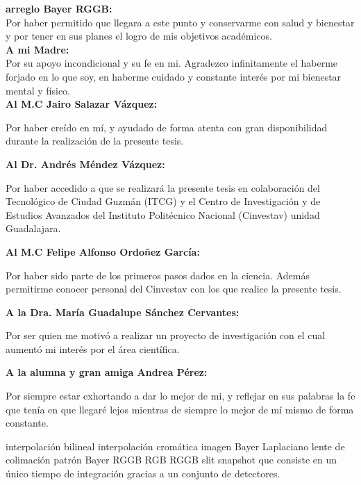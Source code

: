 
{
\textbf{arreglo Bayer RGGB:} \\

Por haber permitido que llegara a este punto y conservarme con salud y bienestar y por tener en sus planes el logro de mis objetivos académicos. \\

\textbf{A mi Madre:} \\

Por su apoyo incondicional y su fe en mi. Agradezco infinitamente el haberme forjado en lo que soy, en haberme cuidado y constante interés por mi bienestar mental y físico. \\

\textbf{Al M.C Jairo Salazar Vázquez:}

Por haber creído en mí, y ayudado de forma atenta con gran disponibilidad durante la realización de la presente tesis.

\textbf{Al Dr. Andrés Méndez Vázquez:}

Por haber accedido a que se realizará la presente tesis en colaboración del Tecnológico de Ciudad Guzmán (ITCG) y el Centro de Investigación y de Estudios Avanzados del Instituto Politécnico Nacional (Cinvestav) unidad Guadalajara.

\textbf{Al M.C Felipe Alfonso Ordoñez García:}

Por haber sido parte de los primeros pasos dados en la ciencia. Además permitirme conocer personal del Cinvestav con los que realice la presente tesis.

\textbf{A la Dra. María Guadalupe Sánchez Cervantes:}

Por ser quien me motivó a realizar un proyecto de investigación con el cual aumentó mi interés por el área científica.

\textbf{A la alumna y gran amiga Andrea Pérez:}

Por siempre estar exhortando a dar lo mejor de mi, y reflejar en sus palabras la fe que tenía en que llegaré lejos mientras de siempre lo mejor de mí mismo de forma constante.
}


interpolación bilineal
interpolación cromática
imagen Bayer
Laplaciano
lente de colimación
patrón Bayer RGGB
RGB
RGGB
slit
snapshot
que consiste en un único tiempo de integración gracias a un conjunto de detectores. 

